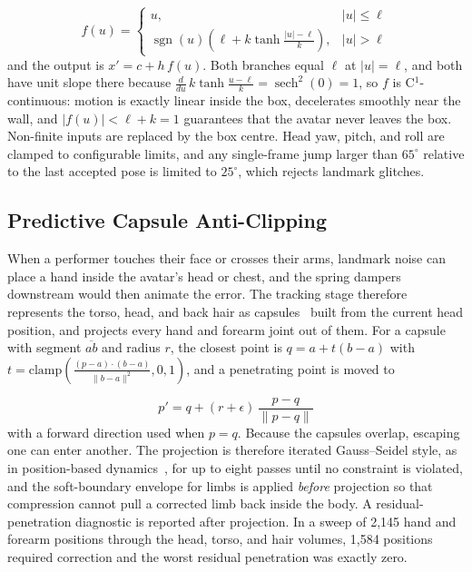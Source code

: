 \documentclass[conference]{IEEEtran}
\begin{document}
\begin{equation}
f(u) = \begin{cases} u, & |u| \le \ell \\ \operatorname{sgn}(u)\left(\ell + k \tanh\frac{|u| - \ell}{k}\right), & |u| > \ell \end{cases}
\label{eq:tanh}
\end{equation}
and the output is $x' = c + h\,f(u)$. Both branches equal $\ell$ at $|u| = \ell$, and both have unit slope there because $\frac{d}{du}\,k\tanh\frac{u-\ell}{k} = \operatorname{sech}^2(0) = 1$, so $f$ is C$^1$-continuous: motion is exactly linear inside the box, decelerates smoothly near the wall, and $|f(u)| < \ell + k = 1$ guarantees that the avatar never leaves the box. Non-finite inputs are replaced by the box centre. Head yaw, pitch, and roll are clamped to configurable limits, and any single-frame jump larger than $65^\circ$ relative to the last accepted pose is limited to $25^\circ$, which rejects landmark glitches.


\subsection{Predictive Capsule Anti-Clipping}
When a performer touches their face or crosses their arms, landmark noise can place a hand inside the avatar's head or chest, and the spring dampers downstream would then animate the error. The tracking stage therefore represents the torso, head, and back hair as capsules~\cite{ericson} built from the current head position, and projects every hand and forearm joint out of them. For a capsule with segment $\overline{ab}$ and radius $r$, the closest point is $q = a + t(b - a)$ with $t = \mathrm{clamp}\!\left(\frac{(p-a)\cdot(b-a)}{\lVert b-a\rVert^2}, 0, 1\right)$, and a penetrating point is moved to

\begin{equation}
p' = q + (r + \epsilon)\,\frac{p - q}{\lVert p - q\rVert}
\label{eq:capsule}
\end{equation}
with a forward direction used when $p = q$. Because the capsules overlap, escaping one can enter another. The projection is therefore iterated Gauss--Seidel style, as in position-based dynamics~\cite{pbd}, for up to eight passes until no constraint is violated, and the soft-boundary envelope for limbs is applied \textit{before} projection so that compression cannot pull a corrected limb back inside the body. A residual-penetration diagnostic is reported after projection. In a sweep of 2,145 hand and forearm positions through the head, torso, and hair volumes, 1,584 positions required correction and the worst residual penetration was exactly zero.
\end{document}
